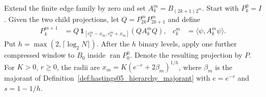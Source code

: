 \begin{definition}
    \label{def:hastings05_constructed_hierarchy}
    \leanok
    Extend the finite edge family by zero and set
    $A_k^m=B_{(2k+1)2^m}$. Start with $P_k^0=I$. Given the two child
    projections, let $Q=P_{2k}^mP_{2k+1}^m$ and define
    \begin{align}
        P_k^{m+1}
          &=Q\,\mathbf1_{[c_k^m-x_m,c_k^m+x_m]}(QA_k^mQ),&
        c_k^m&=\langle\psi,A_k^m\psi\rangle.
        \label{eq:hastings05_constructed_window}
    \end{align}
    Put $h=\max(2,\lceil\log_2N\rceil)$. After the $h$ binary levels,
    apply one further compressed window to $B_0$ inside
    $\operatorname{ran}P_0^h$. Denote the resulting projection by $P$.
    For $K>0$, $r\ge0$, the radii are
    $x_m=K(e^{-r}+2\beta_m)^{1/h}$, where
    $\beta_m$ is the majorant of
    Definition~\ref{def:hastings05_hierarchy_majorant} with
    $e=e^{-r}$ and $s=1-1/h$.
\end{definition}

